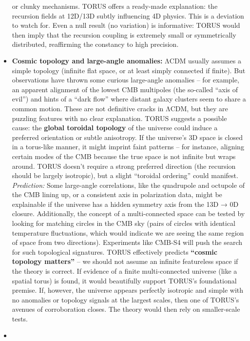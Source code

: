 \documentclass[]{article}
\begin{document}
\begin{itemize}
  or clunky mechanisms. TORUS offers a ready-made explanation: the
  recursion fields at 12D/13D subtly influencing 4D physics​. This is a
  deviation to watch for. Even a null result (no variation) is
  informative: TORUS would then imply that the recursion coupling is
  extremely small or symmetrically distributed, reaffirming the
  constancy to high precision.
\item
  \textbf{Cosmic topology and large-angle anomalies:} ΛCDM usually
  assumes a simple topology (infinite flat space, or at least simply
  connected if finite). But observations have thrown some curious
  large-angle anomalies -- for example, an apparent alignment of the
  lowest CMB multipoles (the so-called ``axis of evil'') and hints of a
  ``dark flow'' where distant galaxy clusters seem to share a common
  motion. These are not definitive cracks in ΛCDM, but they are puzzling
  features with no clear explanation. TORUS suggests a possible cause:
  the \textbf{global toroidal topology} of the universe could induce a
  preferred orientation or subtle anisotropy. If the universe's 3D space
  is closed in a torus-like manner, it might imprint faint patterns --
  for instance, aligning certain modes of the CMB because the true space
  is not infinite but wraps around. TORUS doesn't require a strong
  preferred direction (the recursion should be largely isotropic), but a
  slight ``toroidal ordering'' could manifest. \emph{Prediction:} Some
  large-angle correlations, like the quadrupole and octupole of the CMB
  lining up, or a consistent axis in polarization data, might be
  explainable if the universe has a hidden symmetry axis from the 13D →
  0D closure​. Additionally, the concept of a multi-connected space can
  be tested by looking for matching circles in the CMB sky (pairs of
  circles with identical temperature fluctuations, which would indicate
  we are seeing the same region of space from two directions).
  Experiments like CMB-S4 will push the search for such topological
  signatures​. TORUS effectively predicts \textbf{``cosmic topology
  matters''} -- we should not assume an infinite featureless space if
  the theory is correct. If evidence of a finite multi-connected
  universe (like a spatial torus) is found, it would beautifully support
  TORUS's foundational premise. If, however, the universe appears
  perfectly isotropic and simple with no anomalies or topology signals
  at the largest scales, then one of TORUS's avenues of corroboration
  closes. The theory would then rely on smaller-scale tests.
\item

\end{itemize}
\end{document}

